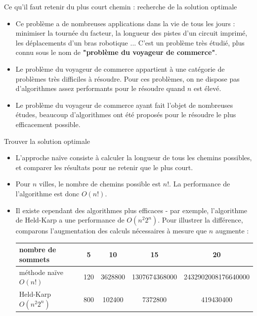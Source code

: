 \begin{frame}{Ce qu'il faut retenir du plus court chemin : recherche de la solution optimale}
  
  \begin{itemize}
    \item Ce problème a de nombreuses applications dans la vie de tous les jours : minimiser la tournée du facteur, la longueur des pistes d'un circuit imprimé, les déplacements d'un bras robotique ... C'est un problème très étudié, plus connu sous le nom de \textbf{"problème du voyageur de commerce"}.
    \item Le problème du voyageur de commerce appartient à une catégorie de problèmes très difficiles à résoudre. Pour ces problèmes, on ne dispose pas d'algorithmes assez performants pour le résoudre quand $n$ est élevé. 
    \item Le problème du voyageur de commerce ayant fait l'objet de nombreuses études, beaucoup d'algorithmes ont été proposés pour le résoudre le plus efficacement possible.
  \end{itemize}

  \begin{block}{Trouver la solution optimale}
    
    \begin{itemize}
      \item L'approche naïve consiste à calculer la longueur de tous les chemins possibles, et comparer les résultats pour ne retenir que le plus court. 
      \item Pour $n$ villes, le nombre de chemins possible est $n!$. La performance de l'algorithme est donc $O(n!)$.
      \item Il existe cependant des algorithmes plus efficaces - par exemple, l'algorithme de Held-Karp a une performance de $O(n^{2}2^n)$. Pour illustrer la différence, comparons l'augmentation des calculs nécessaires à mesure que $n$ augmente :

      \bigskip

      \begin{center}
        \begin{tabular}{|l|cccc|}
          \hline
          nombre de sommets       & 5   & 10      & 15            & 20 \\
          \hline
          méthode naïve $O(n!)$   & 120 & 3628800 & 1307674368000 & 2432902008176640000 \\
          Held-Karp $O(n^{2}2^n)$ & 800 & 102400  & 7372800       & 419430400 \\
          \hline
        \end{tabular} 
      \end{center}


\end{itemize}
\end{block}
\end{frame}
